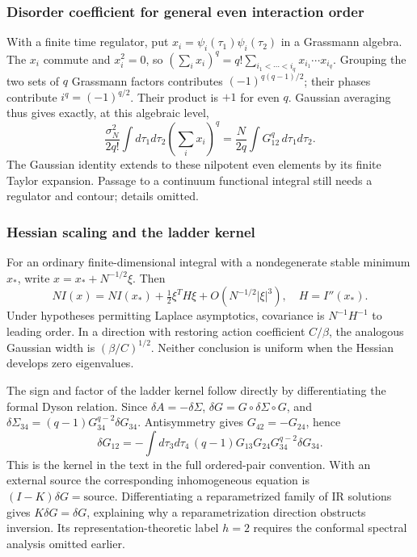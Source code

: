 \documentclass[11pt]{article}
\numberwithin{equation}{section}
\theoremstyle{exposition}
\theoremstyle{result}
\begin{document}
\subsubsection{Disorder coefficient for general even interaction order}
With a finite time regulator, put $x_i=\psi_i(\tau_1)\psi_i(\tau_2)$ in a Grassmann algebra. The $x_i$ commute and $x_i^2=0$, so $(\sum_i x_i)^q=q!\sum_{i_1<\cdots<i_q}x_{i_1}\cdots x_{i_q}$. Grouping the two sets of $q$ Grassmann factors contributes $(-1)^{q(q-1)/2}$; their phases contribute $i^q=(-1)^{q/2}$. Their product is $+1$ for even $q$. Gaussian averaging thus gives exactly, at this algebraic level,
\begin{equation*}
\frac{\sigma_N^2}{2q!}\int d\tau_1d\tau_2\left(\sum_i x_i\right)^q
=\frac{N}{2q}\int G_{12}^q\,d\tau_1d\tau_2.
\end{equation*}
The Gaussian identity extends to these nilpotent even elements by its finite Taylor expansion. Passage to a continuum functional integral still needs a regulator and contour; details omitted.

\subsubsection{Hessian scaling and the ladder kernel}
For an ordinary finite-dimensional integral with a nondegenerate stable minimum $x_*$, write $x=x_*+N^{-1/2}\xi$. Then
\begin{equation*}
NI(x)=NI(x_*)+\tfrac12\xi^TH\xi+O(N^{-1/2}|\xi|^3),\quad H=I''(x_*).
\end{equation*}
Under hypotheses permitting Laplace asymptotics, covariance is $N^{-1}H^{-1}$ to leading order. In a direction with restoring action coefficient $C/\beta$, the analogous Gaussian width is $(\beta/C)^{1/2}$. Neither conclusion is uniform when the Hessian develops zero eigenvalues.

The sign and factor of the ladder kernel follow directly by differentiating the formal Dyson relation. Since $\delta A=-\delta\Sigma$, $\delta G=G\circ\delta\Sigma\circ G$, and $\delta\Sigma_{34}=(q-1)G_{34}^{q-2}\delta G_{34}$. Antisymmetry gives $G_{42}=-G_{24}$, hence
\begin{equation*}
\delta G_{12}=-\int d\tau_3d\tau_4\,
(q-1)G_{13}G_{24}G_{34}^{q-2}\delta G_{34}.
\end{equation*}
This is the kernel in the text in the full ordered-pair convention. With an external source the corresponding inhomogeneous equation is $(I-K)\delta G=\text{source}$. Differentiating a reparametrized family of IR solutions gives $K\delta G=\delta G$, explaining why a reparametrization direction obstructs inversion. Its representation-theoretic label $h=2$ requires the conformal spectral analysis omitted earlier.
\end{document}
